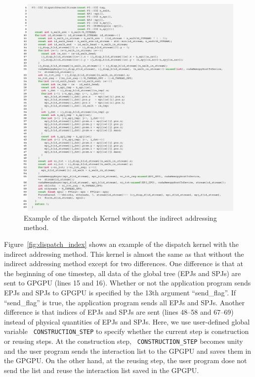 \documentclass[dvipdfmx]{pasj01}
\begin{document}
\begin{figure}
    \begin{center}
      \includegraphics[width=18cm]{./fig/snipet/src_dispatch.eps}
    \end{center}
    \caption{Example of the dispatch Kernel without the indirect addressing method.}
  \label{fig:dispatch}
\end{figure}

Figure~\ref{fig:dispatch_index} shows an example of the dispatch
kernel with the indirect addressing method. This kernel is almost the
same as that without the indirect addressing method except for two
differences. One difference is that at the beginning of one timestep,
all data of the global tree (EPJs and SPJs) are sent to GPGPU (lines
15 and 16). Whether or not the application program sends EPJs and SPJs
to GPGPU is specified by the 13th argument ``send\_flag''. If
``send\_flag'' is true, the application program sends all EPJs and
SPJs. Another difference is that indices of EPJs and SPJs are sent
(lines 48--58 and 67--69) instead of physical quantities of EPJs and
SPJs. Here, we use user-defined global variable {\tt
  CONSTRUCTION\_STEP} to specify whether the current step is
construction or reusing steps. At the construction step, {\tt
  CONSTRUCTION\_STEP} becomes unity and the user program sends the
interaction list to the GPGPU and saves them in the GPGPU. On the
other hand, at the reusing step, the user program dose not send the
list and reuse the interaction list saved in the GPGPU.
\end{document}
